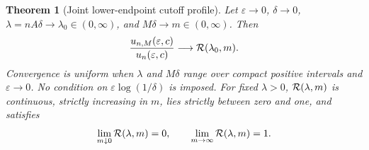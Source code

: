 \documentclass[11pt,a4paper]{article}
\numberwithin{equation}{section}
\newtheorem{theorem}{Theorem}[section]
\theoremstyle{definition}
\theoremstyle{remark}
\newcommand{\ep}{\varepsilon}\newcommand{\la}{\lambda}
\begin{document}
\begin{theorem}[Joint lower-endpoint cutoff profile]\label{thm:cutoff}
Let \(\ep\to0\), \(\delta\to0\),
\(\la=nA\delta\to\la_0\in(0,\infty)\), and
\(M\delta\to m\in(0,\infty)\). Then
\begin{equation}\label{eq:cutoff-limit}
 \frac{u_{n,M}(\ep,c)}{u_n(\ep,c)}\longrightarrow\RR(\la_0,m).
\end{equation}
Convergence is uniform when \(\la\) and \(M\delta\) range over compact
positive intervals and \(\ep\to0\). No condition on
\(\ep\log(1/\delta)\) is imposed.
For fixed \(\la>0\), \(\RR(\la,m)\) is continuous, strictly increasing
in \(m\), lies strictly between zero and one, and satisfies
\begin{equation}\label{eq:Rends}
 \lim_{m\downarrow0}\RR(\la,m)=0,\qquad
 \lim_{m\to\infty}\RR(\la,m)=1.
\end{equation}
\end{theorem}
\end{document}
